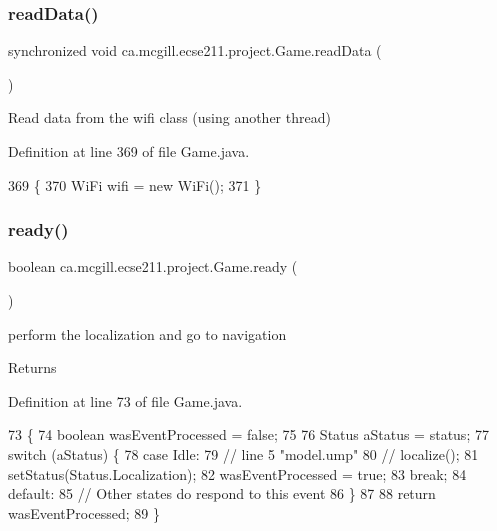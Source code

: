 \subsubsection{\texorpdfstring{read\+Data()}{readData()}}
{\footnotesize\ttfamily synchronized void ca.\+mcgill.\+ecse211.\+project.\+Game.\+read\+Data (\begin{DoxyParamCaption}{ }\end{DoxyParamCaption})}

Read data from the wifi class (using another thread) 

Definition at line 369 of file Game.\+java.


\begin{DoxyCode}
369                                       \{
370     WiFi wifi = \textcolor{keyword}{new} WiFi();
371   \}
\end{DoxyCode}
\mbox{\label{enumca_1_1mcgill_1_1ecse211_1_1project_1_1_game_af0afcc3fad6172857252b89624f48e32}} 
\subsubsection{\texorpdfstring{ready()}{ready()}}
{\footnotesize\ttfamily boolean ca.\+mcgill.\+ecse211.\+project.\+Game.\+ready (\begin{DoxyParamCaption}{ }\end{DoxyParamCaption})}

perform the localization and go to navigation

\begin{DoxyReturn}{Returns}

\end{DoxyReturn}


Definition at line 73 of file Game.\+java.


\begin{DoxyCode}
73                          \{
74     \textcolor{keywordtype}{boolean} wasEventProcessed = \textcolor{keyword}{false};
75 
76     Status aStatus = status;
77     \textcolor{keywordflow}{switch} (aStatus) \{
78       \textcolor{keywordflow}{case} Idle:
79         \textcolor{comment}{// line 5 "model.ump"}
80         \textcolor{comment}{// localize();}
81         setStatus(Status.Localization);
82         wasEventProcessed = \textcolor{keyword}{true};
83         \textcolor{keywordflow}{break};
84       \textcolor{keywordflow}{default}:
85         \textcolor{comment}{// Other states do respond to this event}
86     \}
87 
88     \textcolor{keywordflow}{return} wasEventProcessed;
89   \}
\end{DoxyCode}
\mbox{\label{enumca_1_1mcgill_1_1ecse211_1_1project_1_1_game_a62d510506f1b829fe67dea7270e5b889}} 
